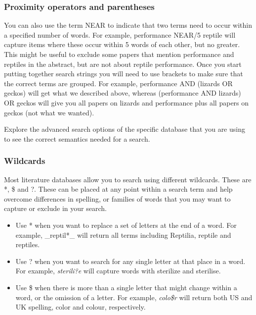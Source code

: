 \documentclass[
]{krantz}
\providecommand{\tightlist}{%
  \setlength{\itemsep}{0pt}\setlength{\parskip}{0pt}}
\begin{document}
\hypertarget{proximity-operators-and-parentheses}{%
\subsubsection{Proximity operators and parentheses}\label{proximity-operators-and-parentheses}}

You can also use the term NEAR to indicate that two terms need to occur within a specified number of words. For example, performance NEAR/5 reptile will capture items where these occur within 5 words of each other, but no greater. This might be useful to exclude some papers that mention performance and reptiles in the abstract, but are not about reptile performance.
Once you start putting together search strings you will need to use brackets to make sure that the correct terms are grouped. For example, performance AND (lizards OR geckos) will get what we described above, whereas (performance AND lizards) OR geckos will give you all papers on lizards and performance plus all papers on geckos (not what we wanted).

Explore the advanced search options of the specific database that you are using to see the correct semantics needed for a search.

\hypertarget{wildcards}{%
\subsubsection{Wildcards}\label{wildcards}}

Most literature databases allow you to search using different wildcards. These are *, \$ and ?. These can be placed at any point within a search term and help overcome differences in spelling, or families of words that you may want to capture or exclude in your search.

\begin{itemize}
\tightlist
\item
  Use * when you want to replace a set of letters at the end of a word. For example, \_reptil*\_ will return all terms including Reptilia, reptile and reptiles.
\item
  Use ? when you want to search for any single letter at that place in a word. For example, \emph{sterili?e} will capture words with sterilize and sterilise.
\item
  Use \$ when there is more than a single letter that might change within a word, or the omission of a letter. For example, \emph{colo\$r} will return both US and UK spelling, color and colour, respectively.
\end{itemize}
\end{document}
